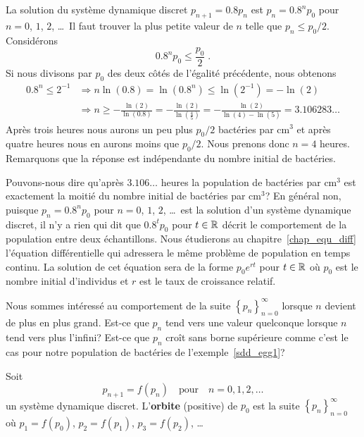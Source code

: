 {\begin{egg}
La solution du système dynamique discret $p_{n+1} = 0.8 p_n$ est
$p_n = 0.8^n p_0$ pour $n=0$, $1$, $2$, \ldots\  Il faut trouver la plus
petite valeur de $n$ telle que $p_n \leq p_0/2$.  Considérons
\[
 0.8^n p_0 \leq \frac{p_0}{2}  \; .
\]
Si nous divisons par $p_0$ des deux côtés de l'égalité précédente, nous
obtenons
\begin{align*}
  0.8^n \leq 2^{-1} &\Rightarrow n \ln(0.8) = \ln(0.8^n) \leq \ln(2^{-1})
= - \ln(2) \\
&\Rightarrow n \geq -\frac{\ln(2)}{\ln(0.8)} =
-\frac{\ln(2)}{\ln\left(\frac{4}{5}\right)} =
-\frac{\ln(2)}{\ln(4)-\ln(5)} = 3.106283\ldots
\end{align*}
Après trois heures nous aurons un peu plus $p_0/2$ bactéries par cm$^3$ et
après quatre heures nous en aurons moins que $p_0/2$.  Nous prenons
donc $n=4$ heures.  Remarquons que la réponse est indépendante du
nombre initial de bactéries.

Pouvons-nous dire qu'après $3.106\ldots$ heures la population de bactéries
par cm$^3$ est exactement la moitié du nombre initial de bactéries
par cm$^3$?  En général non, puisque $p_n = 0.8^n p_0$ pour $n=0$,
$1$, $2$, \ldots\ est la solution d'un système dynamique discret, il
n'y a rien qui dit que $0.8^t p_0$ pour $t\in \mathbb{R}$ décrit le
comportement de la population entre deux échantillons.  Nous étudierons
au chapitre~\ref{chap_equ_diff} l'équation différentielle qui
adressera le même problème de population en temps continu. 
La solution de cet équation sera de la forme $p_0 e^{rt}$
pour $t\in \mathbb{R}$ où $p_0$ est le nombre initial d'individus et $r$ est
le taux de croissance relatif.
\end{egg}

Nous sommes intéressé au comportement de la suite
$\displaystyle \left\{p_n\right\}_{n=0}^\infty$ lorsque $n$ devient de
plus en plus grand.  Est-ce que $p_n$ tend vers une valeur quelconque
lorsque $n$ tend vers plus l'infini?  Est-ce que $p_n$ croît sans
borne supérieure comme c'est le cas pour notre population de bactéries
de l'exemple~\ref{sdd_egg1}?

\begin{focus}{\dfn} 
Soit
\[
p_{n+1}= f(p_n) \quad \text{pour} \quad n=0, 1, 2, \ldots
\]
un système dynamique discret.  L'{\bfseries orbite} (positive) de
$p_0$ est la suite $\displaystyle \left\{ p_n \right\}_{n=0}^\infty$
où $p_1 = f(p_0)$, $p_2 = f(p_1)$, $p_3 = f(p_2)$, \ldots
\end{focus}

}
